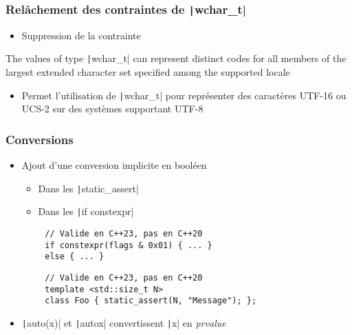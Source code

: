 \documentclass[C++.tex]{subfiles}
\begin{document}
\begin{frame}[fragile]
	\frametitle{Relâchement des contraintes de \texttt|wchar_t|}
	\begin{itemize}
		\item Suppression de la contrainte
	\end{itemize}

	\begin{block}{}
		The values of type \texttt|wchar_t| can represent distinct codes for all members of the largest extended character set specified among the supported locale
	\end{block}

	\begin{itemize}		
		\item Permet l'utilisation de \texttt|wchar_t| pour représenter des caractères UTF-16 ou UCS-2 sur des systèmes supportant UTF-8

	\end{itemize}

\end{frame}

\begin{frame}[fragile]
	\frametitle{Conversions}
	\begin{itemize}
		\item Ajout d'une conversion implicite en booléen
		\begin{itemize}
			\item Dans les \texttt|static_assert|
			\item Dans les \texttt|if constexpr|
		\end{itemize}
	\end{itemize}

	\begin{verbatim}
		// Valide en C++23, pas en C++20
		if constexpr(flags & 0x01) { ... }
		else { ... }
	\end{verbatim}

	\begin{verbatim}
		// Valide en C++23, pas en C++20
		template <std::size_t N>
		class Foo { static_assert(N, "Message"); };
	\end{verbatim}


	\begin{itemize}
		\item \texttt|auto(x)| et \texttt|auto{x}| convertissent \texttt|x| en \textit{prvalue}

	\end{itemize}

\end{frame}
\end{document}
